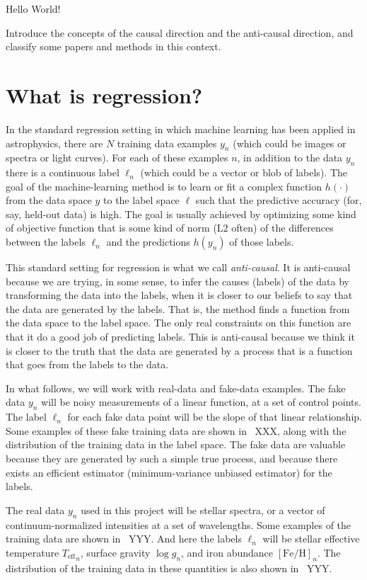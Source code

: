 \documentclass[12pt, letterpaper]{article}
\newcommand{\teff}{{T_{\mathrm{eff}}}}
\newcommand{\logg}{\log g}
\newcommand{\feh}{\left[\mathrm{Fe/H}\right]}
\begin{document}
Hello World!

Introduce the concepts of the causal direction and the anti-causal
direction, and classify some papers and methods in this context.

\section{What is regression?}

In the standard regression setting in which machine learning has been
applied in astrophysics, there are $N$ training data examples $y_n$
(which could be images or spectra or light curves).
For each of these examples $n$, in addition to the data $y_n$ there is
a continuous label $\ell_n$ (which could be a vector or blob of
labels).
The goal of the machine-learning method is to learn or fit a complex
function $h(\cdot)$ from the data space $y$ to the label space $\ell$
such that the predictive accuracy (for, say, held-out data) is high.
The goal is usually achieved by optimizing some kind of objective
function that is some kind of norm (L2 often) of the differences
between the labels $\ell_n$ and the predictions $h(y_n)$ of those
labels.

This standard setting for regression is what we call
\emph{anti-causal}.
It is anti-causal because we are trying, in some sense, to infer the
causes (labels) of the data by transforming the data into the labels,
when it is closer to our beliefs to say that the data are generated by
the labels.
That is, the method finds a function from the data space to the label
space.
The only real constraints on this function are that it do a good job
of predicting labels.
This is anti-causal because we think it is closer to the truth
that the data are generated by a process that is a function that goes 
from the labels to the data.

In what follows, we will work with real-data and fake-data examples.
The fake data $y_n$ will be noisy measurements of a linear function,
at a set of control points.
The label $\ell_n$ for each fake data point will be the slope of that
linear relationship.
Some examples of these fake training data are shown in
\figurename~XXX, along with the distribution of the training data in
the label space.
The fake data are valuable because they are generated by such a simple
true process, and because there exists an efficient estimator
(minimum-variance unbiased estimator) for the labels.

The real data $y_n$ used in this project will be stellar spectra, or
a vector of continuum-normalized intensities at a set of wavelengths.
Some examples of the training data are shown in \figurename~YYY.
And here the labels $\ell_n$ will be stellar effective temperature
$\teff_n$, surface gravity $\logg_n$, and iron abundance $\feh_n$.
The distribution of the training data in these quantities is also
shown in \figurename~YYY.
\end{document}
